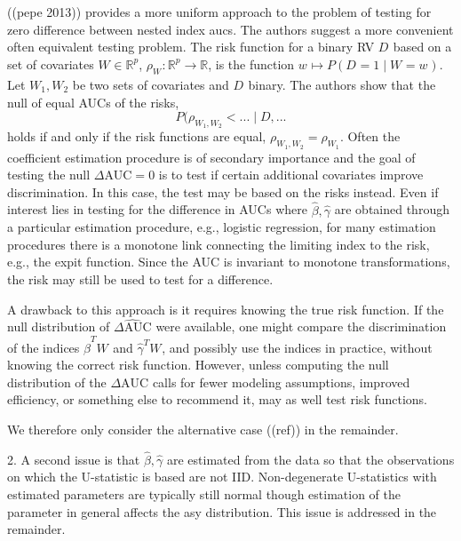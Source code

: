 \documentclass[12pt]{article}
\renewcommand{\P}{P}
\newcommand{\W}[1][]{W_{#1}}
\newcommand{\z}[1][]{w_{#1}}
\newcommand{\D}[1][]{D_{#1}}
\renewcommand{\t}[1]{{#1}^T}
\renewcommand{\star}[1]{{#1}^\ast}
\newcommand{\risk}[1][]{\rho_{#1}}
\newcommand{\aucdiff}{\Delta\text{AUC}}
\newcommand{\aucdiffhat}{\hat{\Delta\text{AUC}}}
\theoremstyle{definition}
\begin{document}
((pepe 2013)) provides a more uniform approach to the problem of testing
 for zero difference between nested index aucs. The authors suggest a more
convenient often equivalent testing problem. The risk function for a
binary RV $\D$ based on a set of covariates $\W\in\mathbb{R}^p$,
$\risk[\W]:\mathbb{R}^p\to\mathbb{R}$, is the function
$\z \mapsto \P(\D=1 \mid \W=\z)$. Let $\W[1],\W[2]$ be two sets of
covariates and $\D$ binary. The authors show that the null of equal
AUCs of the risks,
\[
  \P(\risk[{\W[1],\W[2]}] < ... \mid D,...
\]
holds if and only if the risk functions are equal,
$\risk[{\W[1],\W[2]}]=\risk[{\W[1]}]$. Often the coefficient
estimation procedure is of secondary importance and the goal of
testing the null $\aucdiff=0$ is to test if certain additional
covariates improve discrimination. In this case, the test may be based
on the risks instead. Even if interest lies in testing for the
difference in AUCs where $\hat\beta,\hat\gamma$ are obtained through a
particular estimation procedure, e.g., logistic
regression,%
for many estimation procedures there is a monotone link connecting the limiting index to the risk,
e.g., the expit function. Since the AUC is invariant to monotone
transformations, the risk may still be used to test for a
difference. %

A drawback to this approach is it requires knowing the true risk
function. If the null distribution of $\aucdiffhat$ were available,
one might compare the discrimination of the indices $\t{\hat\beta} \W$ and
$\t{\hat\gamma} \W$, and possibly use the indices in practice, without
knowing the correct risk function. However, unless computing the null
distribution of the $\aucdiff$ calls for fewer modeling assumptions,
improved efficiency, or something else to recommend it, may as well
test risk functions.

We therefore only consider the alternative case ((ref)) in the remainder.

2. A second issue is that $\hat\beta,\hat\gamma$ are estimated from
the data so that the observations on which the U-statistic is based
are not IID. Non-degenerate U-statistics with estimated parameters are
typically still normal though estimation of the parameter in general affects
the asy distribution. This issue is addressed in the remainder.
\end{document}
